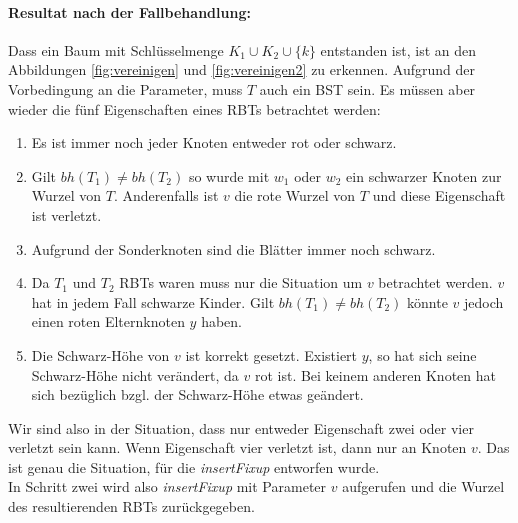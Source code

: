 \documentclass[a4paper,12pt]{article}
\begin{document}
\paragraph{Resultat nach der Fallbehandlung:}
Dass ein Baum mit Schlüsselmenge  $K_1 \cup K_2 \cup \{k\} $ entstanden ist, ist an den Abbildungen \ref{fig:vereinigen} und \ref{fig:vereinigen2} zu erkennen. Aufgrund der Vorbedingung an die Parameter, muss $T$ auch ein BST sein. Es müssen aber wieder die fünf Eigenschaften eines RBTs betrachtet werden:
\begin{enumerate}
	\item Es ist immer noch jeder Knoten entweder rot oder schwarz.
	\item Gilt $bh(T_1) \neq bh(T_2)$ so wurde mit $w_1$ oder $w_2$ ein schwarzer Knoten zur Wurzel von $T$. Anderenfalls ist $v$ die rote Wurzel von $T$ und diese Eigenschaft ist verletzt.   
	\item Aufgrund der Sonderknoten sind die Blätter immer noch schwarz.
	\item Da $T_1$ und $T_2$ RBTs waren muss nur die Situation um $v$ betrachtet werden. $v$ hat in jedem Fall schwarze Kinder. Gilt $bh(T_1) \neq bh(T_2)$ könnte $v$ jedoch einen roten Elternknoten $y$ haben. 
	\item Die Schwarz-Höhe von $v$ ist korrekt gesetzt. Existiert $y$, so hat sich seine Schwarz-Höhe nicht verändert, da $v$ rot ist. Bei keinem anderen Knoten hat sich bezüglich bzgl. der Schwarz-Höhe etwas geändert. 
\end{enumerate} 
Wir sind also in der Situation, dass nur entweder Eigenschaft zwei oder vier verletzt sein kann. Wenn Eigenschaft vier verletzt ist, dann nur an Knoten $v$. Das ist genau die Situation, für die \textit{insertFixup} entworfen wurde.\\
In Schritt zwei wird also \textit{insertFixup} mit Parameter $v$ aufgerufen und die Wurzel des resultierenden RBTs zurückgegeben. 
\end{document}
